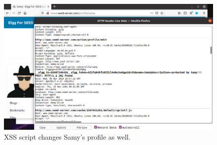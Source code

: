 \begin{figure}
    \centering
    \includegraphics[height=\textheight,width=\textwidth,keepaspectratio]
    {figures/XSS_samy_edit_profile.png}
    \caption{XSS script changes Samy's profile as well.}
    \label{fig:xss_samy_edit_profile}
\end{figure}